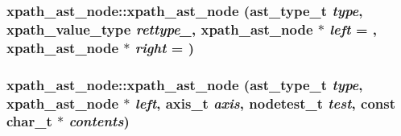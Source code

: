\label{classxpath__ast__node_a8de4244f7b9fc7626049197ddc0afab7}
\hypertarget{classxpath__ast__node_af6f4ffea3f3c7fdb6ef1e759d4b070f4}{
\subsubsection[{xpath\_\-ast\_\-node}]{\setlength{\rightskip}{0pt plus 5cm}xpath\_\-ast\_\-node::xpath\_\-ast\_\-node ({\bf ast\_\-type\_\-t} {\em type}, \/  xpath\_\-value\_\-type {\em rettype\_\-}, \/  {\bf xpath\_\-ast\_\-node} $\ast$ {\em left} = {}, \/  {\bf xpath\_\-ast\_\-node} $\ast$ {\em right} = {})}}
\label{classxpath__ast__node_af6f4ffea3f3c7fdb6ef1e759d4b070f4}
\hypertarget{classxpath__ast__node_a7cf74b277deba86a6575796c727fe458}{
\subsubsection[{xpath\_\-ast\_\-node}]{\setlength{\rightskip}{0pt plus 5cm}xpath\_\-ast\_\-node::xpath\_\-ast\_\-node ({\bf ast\_\-type\_\-t} {\em type}, \/  {\bf xpath\_\-ast\_\-node} $\ast$ {\em left}, \/  {\bf axis\_\-t} {\em axis}, \/  {\bf nodetest\_\-t} {\em test}, \/  const char\_\-t $\ast$ {\em contents})}}
\label{classxpath__ast__node_a7cf74b277deba86a6575796c727fe458}


